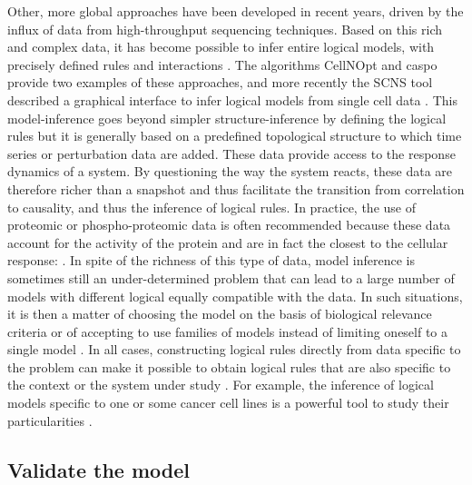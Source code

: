 \documentclass[a4paper,12pt,twoside,onecolumn,openright,final,oldfontcommands]{memoir}
\begin{document}
Other, more global approaches have been developed in recent years,
driven by the influx of data from high-throughput sequencing techniques.
Based on this rich and complex data, it has become possible to infer
entire logical models, with precisely defined rules and interactions
\citep{ostrowski2016boolean}. The algorithms CellNOpt
\citep{terfve2012cellnoptr} and caspo \citep{videla2017caspo} provide
two examples of these approaches, and more recently the SCNS tool
described a graphical interface to infer logical models from single cell
data \citep{woodhouse2018scns}. This model-inference goes beyond simpler
structure-inference by defining the logical rules but it is generally
based on a predefined topological structure to which time series or
perturbation data are added. These data provide access to the response
dynamics of a system. By questioning the way the system reacts, these
data are therefore richer than a snapshot and thus facilitate the
transition from correlation to causality, and thus the inference of
logical rules. In practice, the use of proteomic or phospho-proteomic
data is often recommended because these data account for the activity of
the protein and are in fact the closest to the cellular response:
\citep{ostrowski2016boolean, terfve2012cellnoptr, terfve2015largescale}.
In spite of the richness of this type of data, model inference is
sometimes still an under-determined problem that can lead to a large
number of models with different logical equally compatible with the
data. In such situations, it is then a matter of choosing the model on
the basis of biological relevance criteria or of accepting to use
families of models instead of limiting oneself to a single model
\citep{videla2017caspo}. In all cases, constructing logical rules
directly from data specific to the problem can make it possible to
obtain logical rules that are also specific to the context or the system
under study \citep{saezrodriguez2011comparing}. For example, the
inference of logical models specific to one or some cancer cell lines is
a powerful tool to study their particularities
\citep{razzaq2018computational}.

\subsection{Validate the model}\label{validate-the-model}
\end{document}
